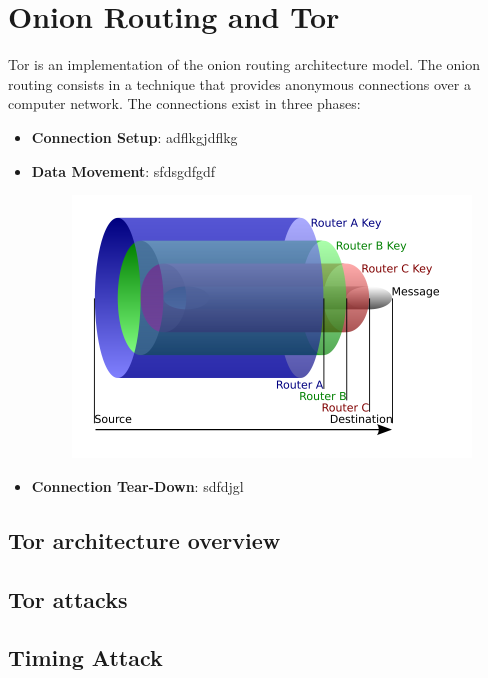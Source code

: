 \section{Onion Routing and Tor}
\label{sec:tor}
Tor is an implementation of the onion routing architecture model. The
onion routing consists in a technique that provides anonymous
connections over a computer network\cite{or}.
The connections exist in three phases:
\begin{itemize}
	\item \textbf{Connection Setup}: adflkgjdflkg
	\item \textbf{Data Movement}: sfdsgdfgdf
		\begin{figure}[H]
			\centering
			\includegraphics[scale=0.35]{onion.png}
			\label{fig:onion}
		\end{figure}	
	\item \textbf{Connection Tear-Down}: sdfdjgl
\end{itemize}

\subsection{Tor architecture overview}
\subsection{Tor attacks}

\subsection{Timing Attack}
